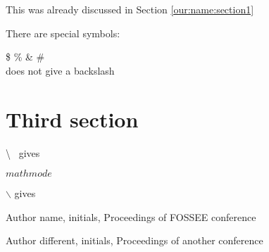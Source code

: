 \documentclass[12pt,a4paper]{beamer}
\begin{document}
This was already discussed in Section \ref{our:name:section1}

There are special symbols:

\$ \% \& \# \\ does not give a backslash

\section{Third section}

\textbackslash ~ gives

$ math mode$ 



$\backslash$ gives

\begin{thebibliography}{10}

 Author name, initials, Proceedings of FOSSEE conference


 Author different, initials, Proceedings of another conference
\end{thebibliography}
\end{document}
